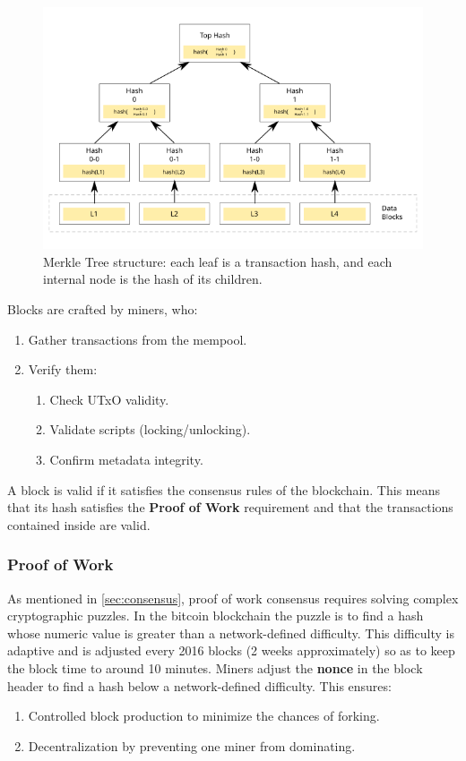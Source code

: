 \begin{figure}[htbp!]
  \centering
  \includegraphics[width=1.0\textwidth]{figures/bitcoin/Hash_Tree.svg.png}
  \caption[Merkle Tree]{Merkle Tree structure: each leaf is a transaction hash, and each internal node is the
  hash of its children.}
  \label{fig:merkle_tree}
\end{figure}
Blocks are crafted by miners, who:
\begin{enumerate}
  \item Gather transactions from the mempool.
  \item Verify them:
    \begin{enumerate}
      \item Check UTxO validity.
      \item Validate scripts (locking/unlocking).
      \item Confirm metadata integrity.
    \end{enumerate}
\end{enumerate}

A block is valid if it satisfies the consensus rules of the blockchain.
This means that its hash satisfies the \textbf{Proof of Work} requirement and that the transactions contained
inside are valid.

\subsubsection{Proof of Work}
As mentioned in \ref{sec:consensus}, proof of work consensus requires solving complex cryptographic puzzles.
In the bitcoin blockchain the puzzle is to find a hash whose numeric value is greater than a network-defined difficulty.
This difficulty is adaptive and is adjusted every 2016 blocks (2 weeks approximately) so as to keep the block
time to around 10 minutes.
Miners adjust the \textbf{nonce} in the block header to find a hash below a network-defined difficulty. This ensures:
\begin{enumerate}
  \item Controlled block production to minimize the chances of forking.
  \item Decentralization by preventing one miner from dominating.
\end{enumerate}

